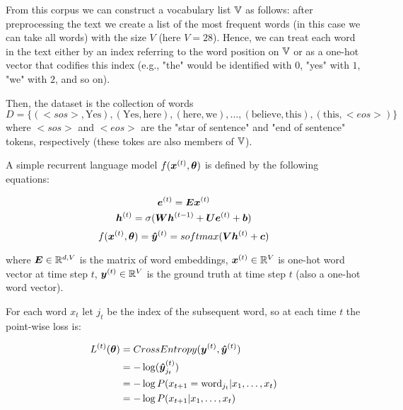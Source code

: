 From this corpus we can construct a vocabulary list $\mathbb{V}$ as follows: after preprocessing the text we create a list of the most frequent words (in this case we can take all words) with the size $V$ (here $V=28$). Hence, we can treat each word in the text either by an index referring to the word position on $\mathbb{V}$ or as a one-hot vector that codifies this index (e.g., "the" would be identified with $0$, "yes" with $1$, "we" with $2$, and so on).

Then, the dataset is the collection of words 
\[
D = \{(<sos>, \text{Yes}), (\text{Yes}, \text{here}), (\text{here}, \text{we}),\dots,(\text{believe}, \text{this}), (\text{this}, <eos>)\}
\]
where $<sos>$ and $<eos>$ are the "star of sentence" and "end of sentence" tokens, respectively (these tokes are also members of $\mathbb{V}$).

A simple recurrent language model $f(\bm{x}^{(t)}, \bm{\theta})$ is defined by the following equations:

\begin{equation}
\bm{e}^{(t)} = \bm{E}\bm{x}^{(t)}
\end{equation}
\vspace{0.2cm}
\begin{equation}
\bm{h}^{(t)} = \sigma(\bm{W}\bm{h}^{(t-1)}+ \bm{U}\bm{e}^{(t)}+ \bm{b})
\end{equation}
\vspace{0.2cm}
\begin{equation}
f(\bm{x}^{(t)}, \bm{\theta}) = \bm{\hat{y}}^{(t)} = softmax(\bm{V}\bm{h}^{(t)} + \bm{c})
\end{equation}

where $\bm{E} \in \mathbb{R}^{d,V}$ is the matrix of word embeddings, $\bm{x}^{(t)} \in \mathbb{R}^{V}$ is one-hot word vector at time step $t$, $\bm{y}^{(t)} \in \mathbb{R}^{V}$ is the ground truth at time step $t$ (also a one-hot word vector).

For each word $x_t$ let $j_t$ be the index of the subsequent word, so at each time $t$ the point-wise loss is:

\begin{align}
\label{lossCE}
L^{(t)}(\bm{\theta}) &= CrossEntropy(\bm{y}^{(t)},\bm{\hat{y}}^{(t)})\\
    &= - \log({\bm{\hat{y}}^{(t)}}_{j_t})\\
        &= - \log P(x_{t+1} = \text{word}_{j_t}|x_{1}, \dots, x_{t})\\
        &= - \log P(x_{t+1}|x_{1}, \dots, x_{t})
\end{align}

